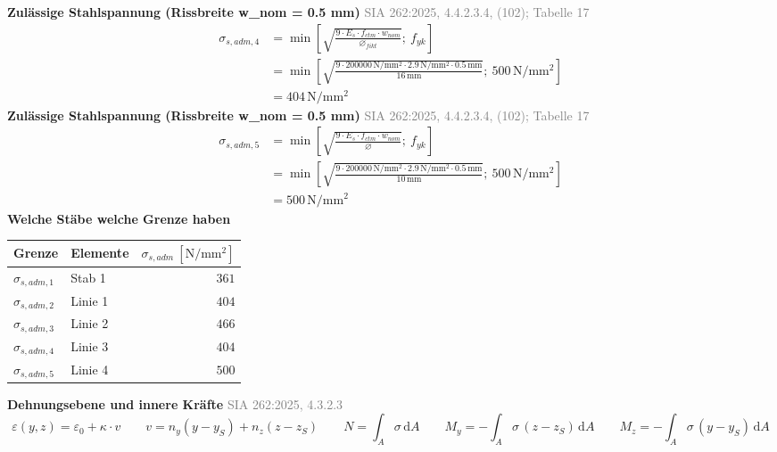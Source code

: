 \documentclass[11pt,a4paper]{article}
\newcommand{\normref}[1]{{\small\textcolor{gray}{#1}}}
\begin{document}
\noindent\textbf{Zulässige Stahlspannung (Rissbreite w\_nom = 0.5 mm)} \hfill \normref{SIA 262:2025, 4.4.2.3.4, (102); Tabelle 17}
\begin{equation*}
\begin{aligned}
  \sigma_{s,adm,4} &= \min\left[\sqrt{\frac{9 \cdot E_s \cdot f_{ctm} \cdot w_{nom}}{\varnothing_{fikt}}};\ f_{yk}\right] \\
  &= \min\left[\sqrt{\frac{9 \cdot 200000\,\mathrm{N}/\mathrm{mm}^{2} \cdot 2.9\,\mathrm{N}/\mathrm{mm}^{2} \cdot 0.5\,\mathrm{mm}}{16\,\mathrm{mm}}};\ 500\,\mathrm{N}/\mathrm{mm}^{2}\right] \\
  &= 404\,\mathrm{N}/\mathrm{mm}^{2}
\end{aligned}
\end{equation*}
\noindent\textbf{Zulässige Stahlspannung (Rissbreite w\_nom = 0.5 mm)} \hfill \normref{SIA 262:2025, 4.4.2.3.4, (102); Tabelle 17}
\begin{equation*}
\begin{aligned}
  \sigma_{s,adm,5} &= \min\left[\sqrt{\frac{9 \cdot E_s \cdot f_{ctm} \cdot w_{nom}}{\varnothing}};\ f_{yk}\right] \\
  &= \min\left[\sqrt{\frac{9 \cdot 200000\,\mathrm{N}/\mathrm{mm}^{2} \cdot 2.9\,\mathrm{N}/\mathrm{mm}^{2} \cdot 0.5\,\mathrm{mm}}{10\,\mathrm{mm}}};\ 500\,\mathrm{N}/\mathrm{mm}^{2}\right] \\
  &= 500\,\mathrm{N}/\mathrm{mm}^{2}
\end{aligned}
\end{equation*}
\noindent\textbf{Welche Stäbe welche Grenze haben}
\begin{longtable}{llr}
\hline
Grenze & Elemente & $\sigma_{s,adm}\ [\mathrm{N/mm^2}]$ \\
\hline
\endhead
$\sigma_{s,adm,1}$ & Stab 1 & $361$ \\
$\sigma_{s,adm,2}$ & Linie 1 & $404$ \\
$\sigma_{s,adm,3}$ & Linie 2 & $466$ \\
$\sigma_{s,adm,4}$ & Linie 3 & $404$ \\
$\sigma_{s,adm,5}$ & Linie 4 & $500$ \\
\hline
\end{longtable}
\noindent\textbf{Dehnungsebene und innere Kräfte} \hfill \normref{SIA 262:2025, 4.3.2.3}
\begin{equation*}
\varepsilon(y, z) = \varepsilon_0 + \kappa \cdot v \qquad v = n_y (y - y_S) + n_z (z - z_S) \qquad N = \int_A \sigma\,\mathrm{d}A \qquad M_y = -\int_A \sigma\,(z - z_S)\,\mathrm{d}A \qquad M_z = -\int_A \sigma\,(y - y_S)\,\mathrm{d}A
\end{equation*}
\end{document}
